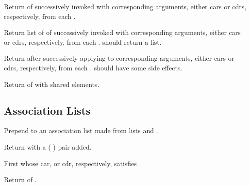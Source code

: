 \begin{LIST}{1cm}
  {
  Return  of  successively
  invoked with corresponding arguments, either cars or cdrs, respectively,
  from each . 
  }

  {
  Return list of 
   of
   successively invoked with corresponding arguments,
  either cars or cdrs, respectively,
  from each .  should return a list.
  }

  {
  Return  after successively applying
   to corresponding arguments, either cars or cdrs,
  respectively, from each .  should have some side
  effects. 
  }

  {
  Return  of  with shared elements.
  }

\end{LIST}


\subsection{Association Lists} 
\label{section:Association Lists}
\begin{LIST}{1cm}

  {
    Prepend to  an association list made from lists  and .
  }

  {
  Return  with a (  ) pair added.
  }

  {
%
  First  whose car, or cdr, respectively, satisfies .
  }

  {
  Return  of .
  }

\end{LIST}


